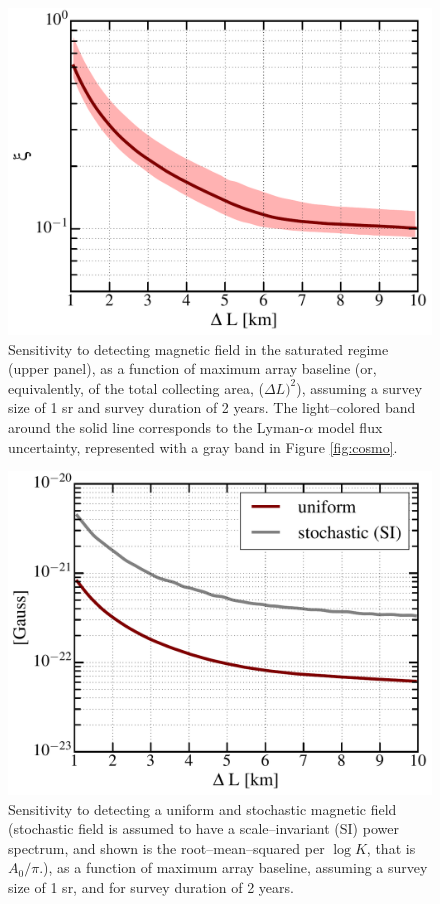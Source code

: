 \begin{figure}
\centering
\includegraphics[width=.35\textwidth,keepaspectratio=true]{xi_vs_deltas.pdf}
\caption{Sensitivity to detecting magnetic field in the saturated regime (upper panel), as a function of maximum array baseline (or, equivalently, of the total collecting area, ($\Delta L)^2$), assuming a survey size of 1 sr and survey duration of 2 years. The light--colored band around the solid line corresponds to the Lyman-$\alpha$ model flux uncertainty, represented with a gray band in Figure \ref{fig:cosmo}.\label{fig:xi_vs_deltas}}
\end{figure}
\begin{figure}
\centering
\includegraphics[width=.35\textwidth,keepaspectratio=true]{B_vs_deltas.pdf}
\caption{Sensitivity to detecting a uniform and stochastic magnetic field (stochastic field is assumed to have a scale--invariant (SI) power spectrum, and shown is the root--mean--squared per $\log K$, that is $A_0/\pi$.), as a function of maximum array baseline, assuming a survey size of 1 sr, and for survey duration of 2 years.\label{fig:B_vs_deltas}}
\end{figure}
